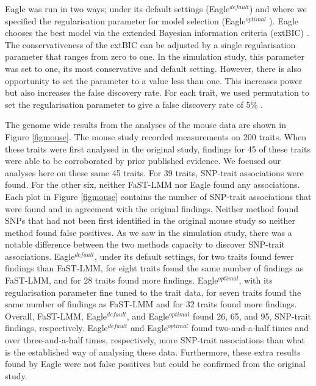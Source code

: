 \documentclass{article}
\begin{document}
Eagle was run in two ways; under its default settings (Eagle$^{default}$) and where we specified the regularisation parameter for model selection (Eagle$^{optimal}$ ). Eagle chooses the best model via the extended Bayesian information criteria (extBIC) \cite{chen2008extended}. 
  The conservativeness of the extBIC can be adjusted by a single regularisation parameter that ranges from zero to one. In the simulation study, this parameter was set to one, its most conservative and default setting. However, there is also opportunity to set the parameter to a value less than one. This increases power but also increases the false discovery rate. For each trait, we used permutation to set the regularisation parameter to give a false discovery rate of 5\% .

The genome wide results from the analyses of the mouse data are shown in Figure  \ref{figmouse}. The mouse study recorded
measurements on 200 traits. When these traits were first analysed in the original study, findings for 45 of these traits were able to be 
corroborated by prior published evidence. We focused our analyses here on these same 45 traits. For 39 traits, SNP-trait associations 
were found. For the other six, neither FaST-LMM nor Eagle found any associations. 
Each plot in Figure  \ref{figmouse} contains the number of SNP-trait associations that were found and in agreement with the original findings. 
Neither method found SNPs that had not been first identified in the original mouse study so neither method found false positives. 
As we saw in the simulation study, there was a notable difference between the two methods capacity to discover SNP-trait associations. Eagle$^{default}$, under its default settings, for two traits found fewer findings than FaST-LMM, for eight traits found the same number 
of findings as FaST-LMM, and for 28 traits found more findings. Eagle$^{optimal}$, 
with its regularisation parameter fine tuned to the trait data, for seven traits found the same number of findings as FaST-LMM and for 32 traits found more findings. Overall, FaST-LMM, Eagle$^{default}$, and Eagle$^{optimal}$ found 26, 65, and 95, SNP-trait findings, respectively. 
Eagle$^{default}$ and Eagle$^{optimal}$ found two-and-a-half times and over three-and-a-half times, respectively, more SNP-trait 
associations than what is the established way of analysing these data. Furthermore, these extra results found by Eagle were not 
false positives but could be confirmed from the original study. 
\end{document}
